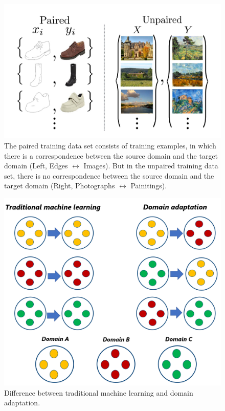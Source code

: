 \begin{figure}[H]
        \begin{center}
	    \includegraphics[scale=0.50]{images/Introduction/img_translation.JPG}
	    \caption[Examples of the paired training data set and the unpaired training data set.]{The paired training data set consists of training examples, in which there is a correspondence between the source domain and the target domain (Left, Edges $\leftrightarrow$ Images). But in the unpaired training data set, there is no correspondence between the source domain and the target domain (Right, Photographs $\leftrightarrow$ Painitings)\cite{zhu2020unpaired}.}
	    \label{fig:img_translation}
	    \end{center}
\end{figure}


\begin{figure}[H]
        \begin{center}
	 	    \includegraphics[scale=0.28]{images/Introduction/DomainAdaptation.png}
	    \caption[Difference between traditional machine learning and domain adaptation.]{Difference between traditional machine learning and domain adaptation.}
	    \label{fig:DomainAdaptation}
	    \end{center}
\end{figure}




